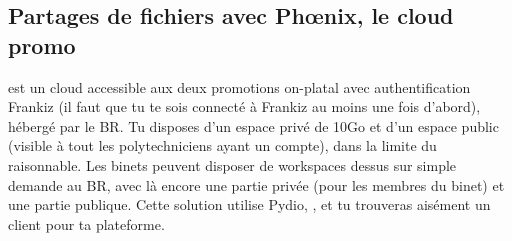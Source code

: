 \subsection{Partages de fichiers avec Phœnix, le cloud promo}
\label{phoenix}
 est un cloud accessible aux deux promotions on-platal avec authentification Frankiz
(il faut que tu te sois connecté à Frankiz au moins une fois d'abord), hébergé par le BR.
Tu disposes d'un espace privé de 10Go et d'un espace public (visible à tout les polytechniciens ayant un compte),
dans la limite du raisonnable. Les binets peuvent disposer de workspaces dessus sur simple demande au BR,
avec là encore une partie privée (pour les membres du binet) et une partie publique.
Cette solution utilise Pydio, ,
et tu trouveras aisément un client pour ta plateforme.

